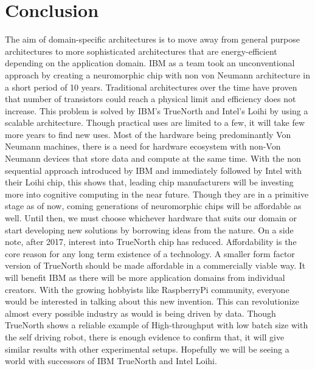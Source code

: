 \documentclass[11pt,twoside]{article}
\begin{document}
\section{Conclusion}
\label{sec:conclusion}
The aim of domain-specific architectures is to move away from general purpose architectures to more sophisticated architectures that are energy-efficient depending on the application domain. IBM as a team took an unconventional approach by creating a neuromorphic chip with non von Neumann architecture in a short period of 10 years. Traditional architectures over the time have proven that number of transistors could reach a physical limit and efficiency does not increase. This problem is solved by IBM's TrueNorth and Intel's Loihi by using a scalable architecture. Though practical uses are limited to a few, it will take few more years to find new uses. Most of the hardware being predominantly Von Neumann machines, there is a need for hardware ecosystem with non-Von Neumann devices that store data and compute at the same time.
With the non sequential approach introduced by IBM and immediately followed by Intel with their Loihi chip, this shows that, leading chip manufacturers will be investing more into cognitive computing in the near future. Though they are in a primitive stage as of now, coming generations of neuromorphic chips will be affordable as well. Until then, we must choose whichever hardware that suits our domain or start developing new solutions by borrowing ideas from the nature.
On a side note, after 2017, interest into TrueNorth chip has reduced. Affordability is the core reason for any long term existence of a technology. A smaller form factor version of TrueNorth should be made affordable in a commercially viable way. It will benefit IBM as there will be more application domains from individual creators. With the growing hobbyists like RaspberryPi community, everyone would be interested in talking about this new invention. This can revolutionize almost every possible industry as would is being driven by data.
Though TrueNorth shows a reliable example of High-throughput with low batch size with the self driving robot\cite{hwu2017self}, there is enough evidence to confirm that, it will give similar results with other experimental setups. Hopefully we will be seeing a world with successors of IBM TrueNorth and Intel Loihi.



\nocite{Hennessy_Patterson_2017}



\end{document}
